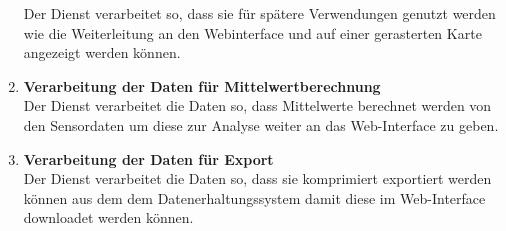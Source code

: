 \begin{enumerate}[label=\textbf{PF\arabic{enumi}0}]
	 Der Dienst verarbeitet so, dass sie für spätere Verwendungen genutzt werden wie die Weiterleitung an den Webinterface und auf einer gerasterten Karte angezeigt werden können.
	 \item \textbf{Verarbeitung der Daten für Mittelwertberechnung}\\
	 Der Dienst verarbeitet die Daten so, dass Mittelwerte berechnet werden von den Sensordaten um diese zur Analyse weiter an das Web-Interface zu geben.
	 \item \textbf{Verarbeitung der Daten für Export}\\
	 Der Dienst verarbeitet die Daten so, dass sie komprimiert exportiert werden können aus dem dem Datenerhaltungssystem damit diese im Web-Interface downloadet werden können.
	  
\end{enumerate}